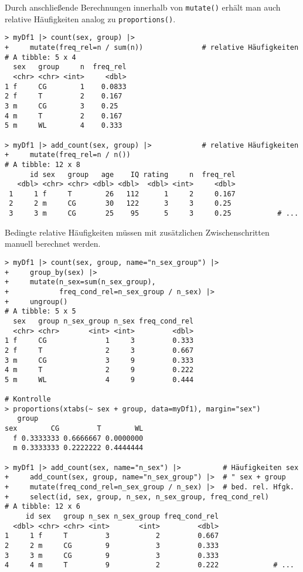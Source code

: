 Durch anschließende Berechnungen innerhalb von \lstinline!mutate()! erhält man auch relative Häufigkeiten analog zu \lstinline!proportions()!.
\begin{lstlisting}
> myDf1 |> count(sex, group) |>
+     mutate(freq_rel=n / sum(n))              # relative Häufigkeiten
# A tibble: 5 x 4
  sex   group     n  freq_rel
  <chr> <chr> <int>     <dbl>
1 f     CG        1    0.0833
2 f     T         2    0.167 
3 m     CG        3    0.25  
4 m     T         2    0.167 
5 m     WL        4    0.333 

> myDf1 |> add_count(sex, group) |>            # relative Häufigkeiten
+     mutate(freq_rel=n / n())
# A tibble: 12 x 8
      id sex   group   age    IQ rating     n  freq_rel
   <dbl> <chr> <chr> <dbl> <dbl>  <dbl> <int>     <dbl>
 1     1 f     T        26   112      1     2     0.167 
 2     2 m     CG       30   122      3     3     0.25  
 3     3 m     CG       25    95      5     3     0.25           # ...
\end{lstlisting}

Bedingte relative Häufigkeiten müssen mit zusätzlichen Zwischenschritten manuell berechnet werden.
\begin{lstlisting}
> myDf1 |> count(sex, group, name="n_sex_group") |>
+     group_by(sex) |>
+     mutate(n_sex=sum(n_sex_group),
+            freq_cond_rel=n_sex_group / n_sex) |>
+     ungroup()
# A tibble: 5 x 5
  sex   group n_sex_group n_sex freq_cond_rel
  <chr> <chr>       <int> <int>         <dbl>
1 f     CG              1     3         0.333
2 f     T               2     3         0.667
3 m     CG              3     9         0.333
4 m     T               2     9         0.222
5 m     WL              4     9         0.444

# Kontrolle
> proportions(xtabs(~ sex + group, data=myDf1), margin="sex")
   group
sex        CG         T        WL
  f 0.3333333 0.6666667 0.0000000
  m 0.3333333 0.2222222 0.4444444

> myDf1 |> add_count(sex, name="n_sex") |>          # Häufigkeiten sex
+     add_count(sex, group, name="n_sex_group") |>  # " sex + group
+     mutate(freq_cond_rel=n_sex_group / n_sex) |>  # bed. rel. Hfgk.
+     select(id, sex, group, n_sex, n_sex_group, freq_cond_rel)
# A tibble: 12 x 6
     id sex   group n_sex n_sex_group freq_cond_rel
  <dbl> <chr> <chr> <int>       <int>         <dbl>
1     1 f     T         3           2         0.667
2     2 m     CG        9           3         0.333
3     3 m     CG        9           3         0.333
4     4 m     T         9           2         0.222             # ...
\end{lstlisting}
